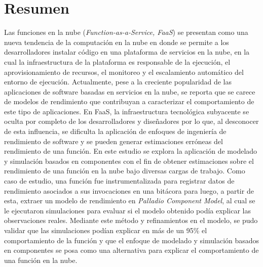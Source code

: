 \section*{Resumen}
Las funciones en la nube (\emph{Function-as-a-Service, FaaS}) se presentan como una nueva tendencia de la computación en la nube en donde se permite a los desarrolladores instalar código en una plataforma de servicios en la nube, en la cual la infraestructura de la plataforma es responsable de la ejecución, el aprovisionamiento de recursos, el monitoreo y el escalamiento automático del entorno de ejecución. Actualmente, pese a la creciente popularidad de las aplicaciones de software basadas en servicios en la nube, se reporta que se carece de modelos de rendimiento que contribuyan a caracterizar el comportamiento de este tipo de aplicaciones. En FaaS, la infraestructura tecnológica subyacente se oculta por completo de los desarrolladores y diseñadores por lo que, al desconocer de esta influencia, se dificulta la aplicación de enfoques de ingeniería de rendimiento de software y se pueden generar estimaciones erróneas del rendimiento de una función. En este estudio se explora la aplicación de modelado y simulación basados en componentes con el fin de obtener estimaciones sobre el rendimiento de una función en la nube bajo diversas cargas de trabajo. Como caso de estudio, una función fue instrumentalizada para registrar datos de rendimiento asociados a sus invocaciones en una bitácora para luego, a partir de esta, extraer un modelo de rendimiento en \emph{Palladio Component Model}, al cual se le ejecutaron simulaciones para evaluar si el modelo obtenido podía explicar las observaciones reales. Mediante este método y refinamientos en el modelo, se pudo validar que las simulaciones podían explicar en más de un 95\% el comportamiento de la función y que el enfoque de modelado y simulación basados en componentes se posa como una alternativa para explicar el comportamiento de una función en la nube. 

\newpage